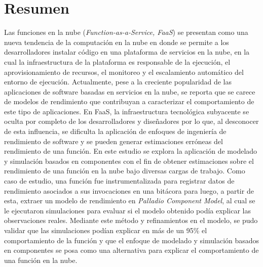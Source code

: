 \section*{Resumen}
Las funciones en la nube (\emph{Function-as-a-Service, FaaS}) se presentan como una nueva tendencia de la computación en la nube en donde se permite a los desarrolladores instalar código en una plataforma de servicios en la nube, en la cual la infraestructura de la plataforma es responsable de la ejecución, el aprovisionamiento de recursos, el monitoreo y el escalamiento automático del entorno de ejecución. Actualmente, pese a la creciente popularidad de las aplicaciones de software basadas en servicios en la nube, se reporta que se carece de modelos de rendimiento que contribuyan a caracterizar el comportamiento de este tipo de aplicaciones. En FaaS, la infraestructura tecnológica subyacente se oculta por completo de los desarrolladores y diseñadores por lo que, al desconocer de esta influencia, se dificulta la aplicación de enfoques de ingeniería de rendimiento de software y se pueden generar estimaciones erróneas del rendimiento de una función. En este estudio se explora la aplicación de modelado y simulación basados en componentes con el fin de obtener estimaciones sobre el rendimiento de una función en la nube bajo diversas cargas de trabajo. Como caso de estudio, una función fue instrumentalizada para registrar datos de rendimiento asociados a sus invocaciones en una bitácora para luego, a partir de esta, extraer un modelo de rendimiento en \emph{Palladio Component Model}, al cual se le ejecutaron simulaciones para evaluar si el modelo obtenido podía explicar las observaciones reales. Mediante este método y refinamientos en el modelo, se pudo validar que las simulaciones podían explicar en más de un 95\% el comportamiento de la función y que el enfoque de modelado y simulación basados en componentes se posa como una alternativa para explicar el comportamiento de una función en la nube. 

\newpage